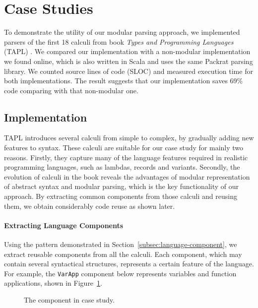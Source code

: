 \section{Case Studies}\label{sec:casestudy}


To demonstrate the utility of our modular parsing approach, we
implemented parsers of the first 18 calculi from book \textit{Types and Programming Languages} (TAPL) \cite{pierce2002types}. We compared our implementation with a non-modular implementation
we found online, which is also written in Scala and uses the same Packrat parsing library.
We counted source lines of code (SLOC) and measured execution time for both implementations.
The result suggests that our implementation saves 69\% code comparing with that non-modular one.

\subsection{Implementation}\label{subsec:implementation}

TAPL introduces several calculi from simple to complex, by gradually adding new features to syntax. These calculi are suitable for our case study for mainly two reasons. Firstly, they capture many of the language features
required in realistic programming languages, such as lambdas, records and variants. Secondly, the evolution of
calculi in the book reveals the advantages of modular representation
of abstract syntax and modular parsing, which is the key functionality
of our approach. By extracting common components from those calculi
and reusing them, we obtain considerably code reuse as shown later.

\paragraph{Extracting Language Components}
Using the pattern demonstrated in Section~\ref{subsec:language-component}, we extract
reusable components from all the calculi. Each
component, which may contain several syntactical structures,
represents a certain feature of the language. For
example, the \lstinline{VarApp} component below represents variables and
function applications, shown in Figure~\ref{fig:casestudy-varapp}.

\begin{figure}[ht]
\caption{The  component in case study.}\label{fig:casestudy-varapp}
\end{figure}

